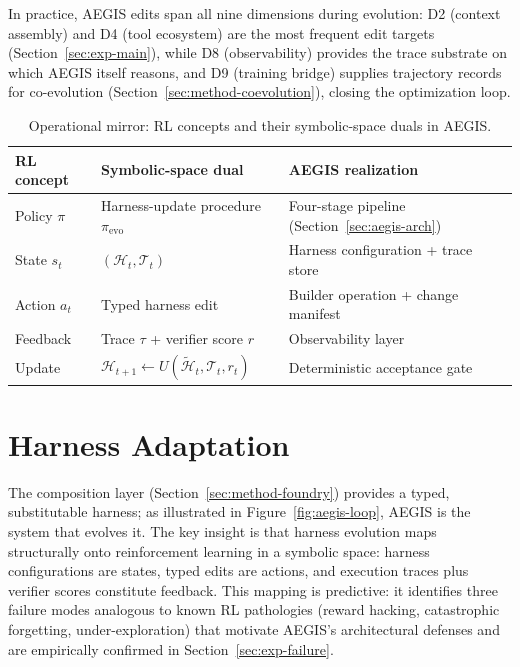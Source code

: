 In practice, AEGIS edits span all nine dimensions during evolution: D2 (context assembly) and D4 (tool ecosystem) are the most frequent edit targets (Section~\ref{sec:exp-main}), while D8 (observability) provides the trace substrate on which AEGIS itself reasons, and D9 (training bridge) supplies trajectory records for co-evolution (Section~\ref{sec:method-coevolution}), closing the optimization loop.





\begin{table}[!htbp]
\centering
\small
\begin{tabular}{lll}
\toprule
\textbf{RL concept} & \textbf{Symbolic-space dual} & \textbf{AEGIS realization} \\
\midrule
Policy $\pi$ & Harness-update procedure $\pi_{\mathrm{evo}}$ & Four-stage pipeline (Section~\ref{sec:aegis-arch}) \\
State $s_t$ & $(\mathcal{H}_t, \mathcal{T}_t)$ & Harness configuration + trace store \\
Action $a_t$ & Typed harness edit & Builder operation + change manifest \\
Feedback & Trace $\tau$ + verifier score $r$ & Observability layer \\
Update & $\mathcal{H}_{t+1} \leftarrow U(\widetilde{\mathcal{H}}_{t}, \mathcal{T}_t, r_t)$ & Deterministic acceptance gate \\
\bottomrule
\end{tabular}
\caption{Operational mirror: RL concepts and their symbolic-space duals in AEGIS.}
\label{tab:operational-mirror}
\end{table}


\section{Harness Adaptation}
\label{sec:method-aegis}

The composition layer (Section~\ref{sec:method-foundry}) provides a typed, substitutable harness; as illustrated in Figure~\ref{fig:aegis-loop}, AEGIS is the system that evolves it. The key insight is that harness evolution maps structurally onto reinforcement learning in a symbolic space: harness configurations are states, typed edits are actions, and execution traces plus verifier scores constitute feedback. This mapping is predictive: it identifies three failure modes analogous to known RL pathologies (reward hacking, catastrophic forgetting, under-exploration) that motivate AEGIS's architectural defenses and are empirically confirmed in Section~\ref{sec:exp-failure}.

